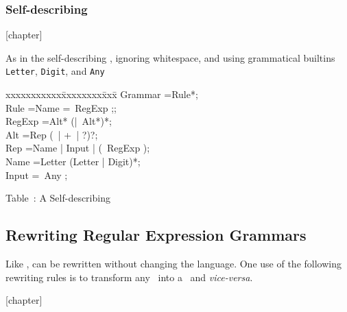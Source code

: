 \subsubsection{Self-describing \reg}

{}[chapter]
\setcounter{SelfReg}{\value{table}}

As in the self-describing \cfg, ignoring whitespace, and using 
grammatical builtins
{\tt Letter}, {\tt Digit}, and {\tt Any}

\begin{samepage}
\begin{tt}
\begin{tabbing}
xxxxxxxxxxx\=xxxxxxxx\=xxx\=\kill
\>Grammar \>=\>Rule*;                                           \\
\>Rule    \>=\>Name \sq=\sq\ RegExp \sq;\sq;                    \\
\>RegExp  \>=\>Alt* (\sq|\sq\ Alt*)*;                           \\
\>Alt     \>=\>Rep (\sq*\sq\ | \sq+\sq\ | \sq?\sq)?;            \\
\>Rep     \>=\>Name | Input | \sq(\sq\ RegExp \sq)\sq;          \\
\>Name    \>=\>Letter (Letter | Digit)*;                        \\
\>Input   \>=\>\sq\sq\sq\ Any \sq\sq\sq;                        \\
\end{tabbing}
\end{tt}
\begin{center}
Table~\thetable: A Self-describing 
\end{center}
\end{samepage}

\subsection{Rewriting Regular Expression Grammars}

\noindent Like ,  can be rewritten without changing the
language. One use of the following rewriting rules is to transform any
\cfg\ into a \reg\ and {\em vice-versa}.

\vspace{1em}

{}[chapter]
\setcounter{RegTx}{\value{table}}

